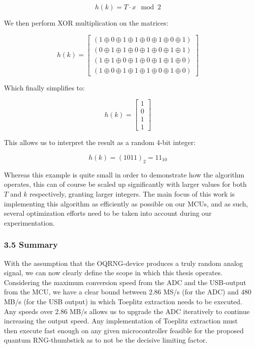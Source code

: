 \[
h(k) = T \cdot x \mod 2
\]

\phantom{TEMP LINEBREAK}

We then perform XOR multiplication on the matrices:

\[
h(k) =
\begin{bmatrix}
(1 \oplus 0 \oplus 1 \oplus 1 \oplus 0 \oplus 1 \oplus 0 \oplus 1) \\
(0 \oplus 1 \oplus 1 \oplus 0 \oplus 1 \oplus 0 \oplus 1 \oplus 1) \\
(1 \oplus 1 \oplus 0 \oplus 1 \oplus 0 \oplus 1 \oplus 1 \oplus 0) \\
(1 \oplus 0 \oplus 1 \oplus 1 \oplus 1 \oplus 0 \oplus 1 \oplus 0)
\end{bmatrix}
\]

Which finally simplifies to:

\[
h(k) =
\begin{bmatrix}
1 \\
0 \\
1 \\
1
\end{bmatrix}
\]

This allows us to interpret the result as a random 4-bit integer:

\[
h(k) = (1011)_2 = 11_{10}
\]

Whereas this example is quite small in order to demonstrate how the algorithm operates, this can of course be scaled up significantly with larger values for both \(T\) and \(k\) respectively, granting larger integers. The main focus of this work is implementing this algorithm as efficiently as possible on our MCUs, and as such, several optimization efforts need to be taken into account during our experimentation.

\subsubsection{3.5 Summary}\label{summary}

With the assumption that the OQRNG-device produces a truly random analog signal, we can now clearly define the scope in which this thesis operates. Considering the maximum conversion speed from the ADC and the USB-output from the MCU, we have a clear bound between 2.86 MS/s (for the ADC) and 480 MB/s (for the USB output) in which Toeplitz extraction needs to be executed. Any speeds over 2.86 MB/s allows us to upgrade the ADC iteratively to continue increasing the output speed. Any implementation of Toeplitz extraction must then execute fast enough on any given microcontroller feasible for the proposed quantum RNG-thumbstick as to not be the decisive limiting factor.

